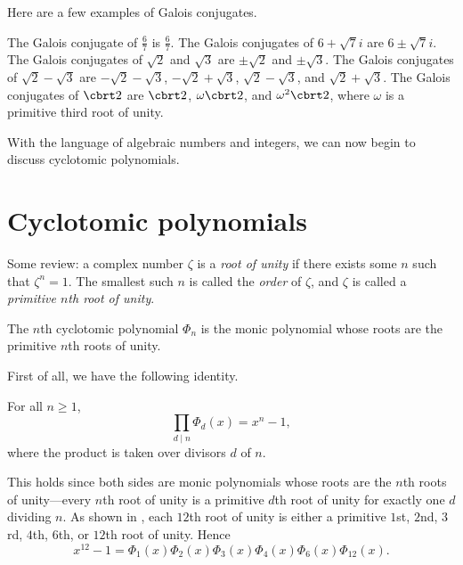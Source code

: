 \documentclass[11pt]{scrartcl}
\begin{document}
Here are a few examples of Galois conjugates.
\begin{itemize}
	\ii The Galois conjugate of $\frac67$ is $\frac67$.
	\ii The Galois conjugates of $6 + \sqrt7i$ are $6 \pm \sqrt7i$.
	\ii The Galois conjugates of $\sqrt 2$ and $\sqrt 3$ are $\pm \sqrt2$ and $\pm \sqrt3$. The Galois conjugates of $\sqrt2 - \sqrt3$ are $-\sqrt2 -\sqrt3$, $-\sqrt2 + \sqrt3$, $\sqrt2 - \sqrt3$, and $\sqrt2 + \sqrt3$.
	\ii The Galois conjugates of $\cbrt2$ are $\cbrt2$, $\omega\cbrt2$, and $\omega^2\cbrt2$, where $\omega$ is a primitive third root of unity.
\end{itemize}
With the language of algebraic numbers and integers, we can now begin to discuss cyclotomic polynomials.

\section{Cyclotomic polynomials}

Some review: a complex number $\zeta$ is a \emph{root of unity} if there exists some $n$ such that $\zeta^n = 1$. The smallest such $n$ is called the \emph{order} of $\zeta$, and $\zeta$ is called a \emph{primitive $n$th root of unity}.

\begin{definition}
	The $n$th cyclotomic polynomial $\Phi_n$ is the monic polynomial whose roots are the primitive $n$th roots of unity.
\end{definition}

First of all, we have the following identity.
\begin{proposition}
	\label{prop:product-formula}
	For all $n \ge 1$,
	\[\prod_{d \mid n}\Phi_d(x) = x^n - 1,\]
	where the product is taken over divisors $d$ of $n$.
\end{proposition}
This holds since both sides are monic polynomials whose roots are the $n$th roots of unity---every $n$th root of unity is a primitive $d$th root of unity for exactly one $d$ dividing $n$. As shown in , each $12$th root of unity is either a primitive $1$st, $2$nd, $3$rd, $4$th, $6$th, or $12$th root of unity. Hence
\[x^{12} - 1 = \Phi_1(x)\Phi_2(x)\Phi_3(x)\Phi_4(x)\Phi_6(x)\Phi_{12}(x).\]
\end{document}
